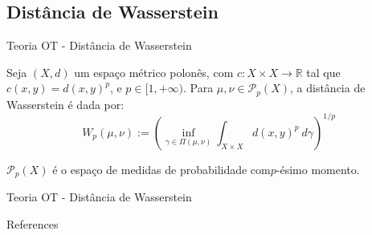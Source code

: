 \documentclass[10pt]{beamer}
\begin{document}
\subsection{Distância de Wasserstein}
\begin{frame}[fragile]{Teoria OT - Distância de Wasserstein}

\begin{definition}

  Seja $(X,d)$ um espaço métrico polonês, com $c:X \times X \to \mathbb R$ tal que $c(x,y)=d(x,y)^p$, e
  $p \in [1,+\infty)$.
  Para $\mu,\nu \in \mathcal P_p(X)$, a distância de Wasserstein é dada por:
  \begin{equation}
    W_p(\mu,\nu) :=
    \left(
    \inf_{\gamma \in \Pi(\mu,\nu)}
    \int_{X \times X} d(x,y)^p \ d\gamma
    \right)^{1/p}
    \label{def:Wasserstein}
  \end{equation}
\end{definition}

$\mathcal P_p(X)$ é o espaço de medidas de probabilidade com$p$-ésimo momento.

\end{frame}

\begin{frame}[fragile]{Teoria OT - Distância de Wasserstein}


\end{frame}

\begin{frame}[allowframebreaks]{References}
	\nocite{*}

  \renewcommand{\section}[2]{}%
\tiny{}

\end{frame}
\end{document}
